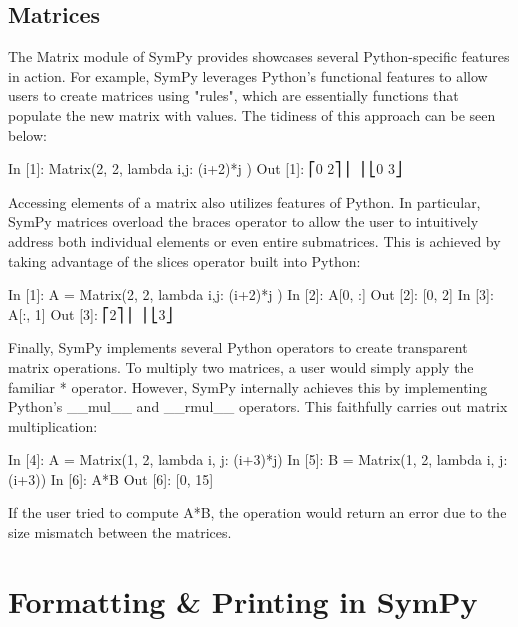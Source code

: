 \documentclass[11pt,a4paper,oneside]{report}
\begin{document}
\subsection*{Matrices}
The Matrix module of SymPy provides showcases several Python-specific features in action. For example, SymPy leverages Python's functional features to allow users to create matrices using "rules", which are essentially functions that populate the new matrix with values. The tidiness of this approach can be seen below:
\begin{verbatimtab}
        In [1]: Matrix(2, 2, lambda i,j: (i+2)*j )
        Out [1]: 
        ⎡0  2⎤
        ⎢    ⎥
        ⎣0  3⎦
\end{verbatimtab}
Accessing elements of a matrix also utilizes features of Python. In particular, SymPy matrices overload the braces operator to allow the user to intuitively address both individual elements or even entire submatrices. This is achieved by taking advantage of the slices operator built into Python:
\begin{verbatimtab}
        In [1]: A = Matrix(2, 2, lambda i,j: (i+2)*j )
        In [2]: A[0, :]
        Out [2]: [0, 2]
        In [3]: A[:, 1]
        Out [3]: 
        ⎡2⎤
        ⎢ ⎥
        ⎣3⎦
\end{verbatimtab}
Finally, SymPy implements several Python operators to create transparent matrix operations. To multiply two matrices, a user would simply apply the familiar * operator. However, SymPy internally achieves this by implementing Python's \_\_mul\_\_ and \_\_rmul\_\_ operators. This faithfully carries out matrix multiplication:
\begin{verbatimtab}
        In [4]: A = Matrix(1, 2, lambda i, j: (i+3)*j)
        In [5]: B = Matrix(1, 2, lambda i, j: (i+3))
        In [6]: A*B
        Out [6]: [0, 15]
\end{verbatimtab}
If the user tried to compute A*B, the operation would return an error due to the size mismatch between the matrices.
\section*{Formatting \& Printing in SymPy}
\end{document}
